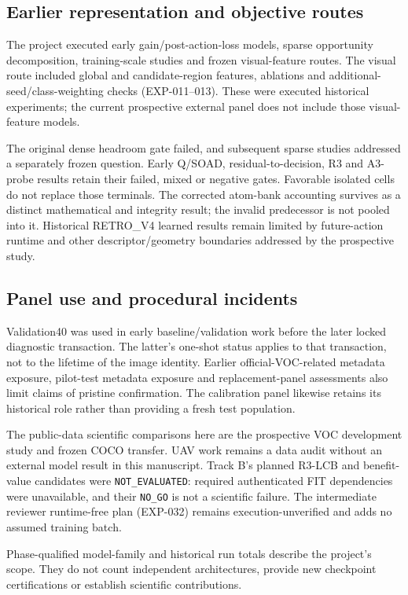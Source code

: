 \subsection{Earlier representation and objective routes}
The project executed early gain/post-action-loss models, sparse opportunity
decomposition, training-scale studies and frozen visual-feature routes.
The visual route included global and candidate-region features, ablations
and additional-seed/class-weighting checks (EXP-011--013). These were
executed historical experiments; the current prospective external panel
does not include those visual-feature models.

The original dense headroom gate failed, and subsequent sparse studies
addressed a separately frozen question. Early Q/SOAD, residual-to-decision,
R3 and A3-probe results retain their failed, mixed or negative gates.
Favorable isolated cells do not replace those terminals. The corrected
atom-bank accounting survives as a distinct mathematical and integrity
result; the invalid predecessor is not pooled into it. Historical
RETRO\_V4 learned results remain limited by future-action runtime and
other descriptor/geometry boundaries addressed by the prospective study.

\subsection{Panel use and procedural incidents}
Validation40 was used in early baseline/validation work before the later
locked diagnostic transaction. The latter's one-shot status applies to
that transaction, not to the lifetime of the image identity. Earlier
official-VOC-related metadata exposure, pilot-test metadata exposure and
replacement-panel assessments also limit claims of pristine confirmation.
The calibration panel likewise retains its historical role rather than
providing a fresh test population.

The public-data scientific comparisons here are the prospective VOC
development study and frozen COCO transfer. UAV work remains a data audit
without an external model result in this manuscript. Track B's planned R3-LCB and
benefit-value candidates were \texttt{NOT\_EVALUATED}: required
authenticated FIT dependencies were unavailable, and their \texttt{NO\_GO}
is not a scientific failure. The intermediate reviewer runtime-free plan
(EXP-032) remains execution-unverified and adds no assumed training batch.

Phase-qualified model-family and historical run totals describe the
project's scope. They do not count independent architectures, provide new
checkpoint certifications or establish scientific contributions.
